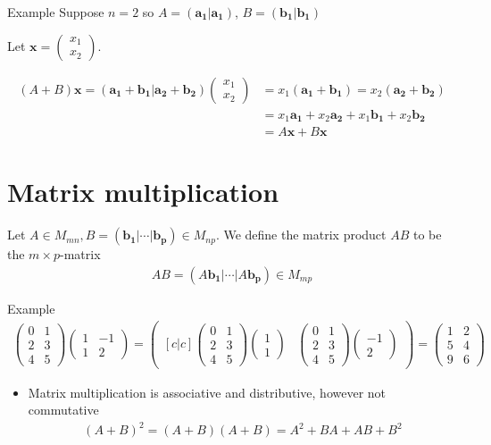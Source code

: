 \documentclass{report}
\renewcommand{\vec}{\mathbf}
\newcommand{\cvec}[1]{ \begin{pmatrix} #1 \end{pmatrix} }
\begin{document}
	\begin{question}{Example}
		Suppose $n=2$ so $A = (\vec{a_1}|\vec{a_1})$, $B = (\vec{b_1}|\vec{b_1})$

		Let $\vec{x} = \cvec{x_1\\x_2}$.

		\begin{align*}
			(A+B)\vec{x} = (\vec{a_1} + \vec{b_1} | \vec{a_2} + \vec{b_2}) \cvec{x_1\\x_2} &= x_1(\vec{a_1} + \vec{b_1}) = x_2(\vec{a_2} + \vec{b_2})	\\
																						   &= x_1 \vec{a_1} + x_2 \vec{a_2} + x_1 \vec{b_1} + x_2 \vec{b_2}	\\
																						   &= A\vec{x} + B\vec{x}
		\end{align*}
	\end{question}

	\section{Matrix multiplication}

	Let $A \in M_{mn}, B = (\vec{b_1}|\cdots|\vec{b_p}) \in M_{np}$. We define the matrix product $AB$ to be the $m\times p$-matrix
	\begin{align*}
		AB = (A\vec{b_1}|\cdots|A\vec{b_p}) \in M_{mp}
	\end{align*}
	\begin{question}{Example}
		\begin{align*}
			\cvec{0 & 1 \\ 2 & 3 \\ 4 & 5} \cvec{1 & -1 \\ 1 & 2} = 
			\begin{pmatrix}[c|c]
				\cvec{0 & 1 \\ 2 & 3 \\ 4 & 5} \cvec{1\\1} & \cvec{0 & 1 \\ 2 & 3 \\ 4 & 5} \cvec{-1\\2}
			\end{pmatrix} = \cvec{1&2\\5&4\\9&6}
		\end{align*}
	\end{question}

	\begin{itemize}
		\item Matrix multiplication is associative and distributive, however not commutative
			\begin{align*}
				(A+B)^2 = (A+B)(A+B) = A^2 + BA + AB + B^2
			\end{align*}
	\end{itemize}
\end{document}

